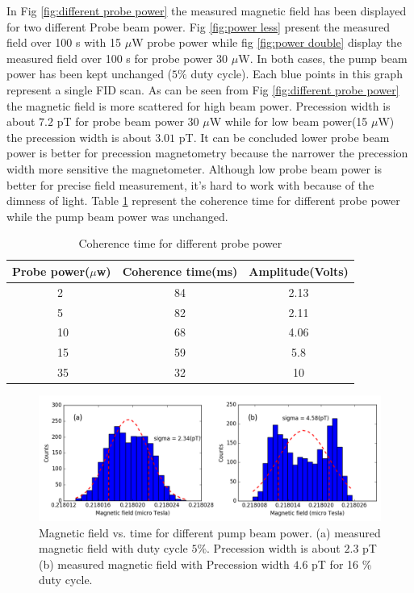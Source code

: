  In Fig \ref{fig:different probe power} the measured magnetic field has been displayed for two different  Probe beam power. Fig \ref{fig:power less} present the measured field over 100 s with 15 $\mu$W probe power while fig \ref{fig:power double} display the measured field over 100 s for probe power 30 $\mu$W. In both cases, the pump beam power has been kept unchanged ($5\%$ duty cycle). Each blue points in this graph represent a single FID scan. As can be seen from Fig \ref{fig:different probe power} the magnetic field is more scattered for high beam power. Precession width is about $7.2$ pT for probe beam power 30 $\mu$W while for low beam power(15 $\mu$W) the precession width is about $3.01$ pT. It can be concluded lower probe beam power is better for precession  magnetometry because the narrower the precession width more sensitive the magnetometer. Although low probe beam power is better for precise field measurement, it's hard to work with because of the dimness of light.
Table  \ref{table:Coherence time for different probe power} represent the coherence time for different probe power while the pump beam power was unchanged.
 \begin{table}%
\centering
\begin{tabular}{|l  |c|c|}\hline
\textbf{Probe power($\mu$w)}    & \textbf{Coherence time(ms)}  & \textbf{Amplitude(Volts)}\\\hline
~~~~~~~~2 & 84 & 2.13   \\
\hline
~~~~~~~~5    & 82 & 2.11  \\
\hline
~~~~~~~~10   &  68 & 4.06 \\
\hline
~~~~~~~~15  &   59 & 5.8  \\
\hline
~~~~~~~~35  &   32 & 10  \\
\hline
\end{tabular}
\caption{Coherence time for different probe power\label{table:Coherence time for different probe power}}
\end{table}
 
 \begin{figure}
    \centering  \includegraphics[width=\textwidth]{figures/pump_beam}
    \caption{ Magnetic field vs. time for different pump beam power. (a) measured magnetic field with duty cycle $5 \%$. Precession width is about $2.3$ pT (b) measured magnetic field with Precession width $4.6$ pT for  16 $\%$ duty cycle.}
    \label{fig:different pump power}
\end{figure}

